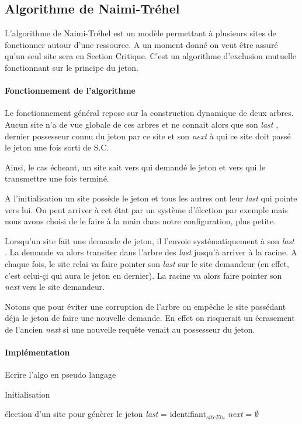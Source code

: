 \documentclass[a4paper,12pt]{article}
\newcommand{\nt}{Naimi-Tréhel }
\newcommand{\last}{\textit{last} }
\newcommand{\next}{\textit{next} }
\begin{document}
\subsection{Algorithme de \nt}

L'algorithme de \nt est un modèle permettant à plusieurs sites de fonctionner autour d'une ressource. A un moment donné on veut être assuré qu'un seul site sera en Section Critique. C'est un algorithme d'exclusion mutuelle fonctionnant sur le principe du jeton.

\paragraph{Fonctionnement de l'algorithme}

Le fonctionnement général repose sur la construction dynamique de deux arbres. Aucun site n'a de vue globale de ces arbres et ne connait alors que son \last, dernier possesseur connu du jeton par ce site et son \next à qui ce site doit passé le jeton une fois sorti de S.C.

Ainsi, le cas écheant, un site sait vers qui demandé le jeton et vers qui le transmettre une fois terminé.

A l'initialisation un site possède le jeton et tous les autres ont leur \last qui pointe vers lui. On peut arriver à cet état par un système d'élection par exemple mais nous avons choisi de le faire à la main dans notre configuration, plus petite.

Lorsqu'un site fait une demande de jeton, il l'envoie systématiquement à son \last. La demande va alors transiter dans l'arbre des \last jusqu'à arriver à la racine. A chaque fois, le site relai va faire pointer son \last sur le site demandeur (en effet, c'est celui-çi qui aura le jeton en dernier). La racine va alors faire pointer son \next vers le site demandeur.

Notons que pour éviter une corruption de l'arbre on empêche le site possédant déja le jeton de faire une nouvelle demande. En effet on risquerait un écrasement de l'ancien \next si une nouvelle requête venait au possesseur du jeton.


\paragraph{Implémentation}
Ecrire l'algo en pseudo langage

\begin{algorithm}[t]
\caption{Initialisation}
\label{algo_naimi_trehel_init}
\begin{algorithmic}[1]
\REQUIRE élection d'un site pour génèrer le jeton
\STATE \last = identifiant$_{siteElu}$
\STATE \next = $\emptyset$
\end{algorithmic}
\end{algorithm}
\end{document}
